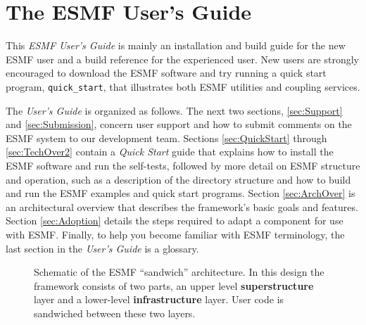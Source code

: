 
\section{The ESMF User's Guide}

This {\it ESMF User's Guide} is mainly an installation and build guide for
the new ESMF user and a build reference for the experienced user.  
New users are strongly encouraged to download the ESMF software and try
running a quick start program, {\tt quick\_start}, that illustrates
both ESMF utilities and coupling services.  

The {\it User's Guide} is organized as follows.  The next two sections, 
\ref{sec:Support} and \ref{sec:Submission}, 
concern user support and how to submit comments on the ESMF system 
to our development team.  
Sections \ref{sec:QuickStart} through \ref{sec:TechOver2} contain a 
{\it Quick Start} guide that explains how to install the ESMF software 
and run the self-tests, 
followed by more detail on ESMF structure and operation, 
such as a description of the directory structure and how to build and
run the ESMF examples and quick start programs.
Section \ref{sec:ArchOver} is an architectural overview that describes the
framework's basic goals and features.  
Section \ref{sec:Adoption} details the steps required to adapt a component
for use with ESMF.  Finally, to help you become familiar with ESMF
terminology, the last section in the {\it User's Guide} is a glossary.

\begin{center}
\begin{figure}
\caption{Schematic of the ESMF ``sandwich'' architecture. In this 
design the framework consists of two parts, an upper level
{\bf superstructure} layer and a lower-level {\bf infrastructure} layer. 
User code is sandwiched between these two layers.}
\label{fig:TheESMFwich}
\end{figure}
\end{center}


